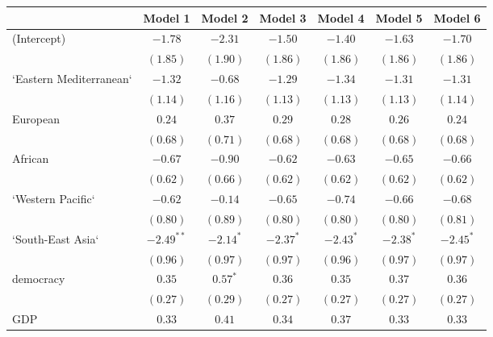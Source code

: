 
\begin{table}[!h]
\begin{center}
\begin{tabular}{l c c c c c c }
\toprule
 & Model 1 & Model 2 & Model 3 & Model 4 & Model 5 & Model 6 \\
\midrule
(Intercept)             & $-1.78$      & $-2.31$      & $-1.50$      & $-1.40$      & $-1.63$      & $-1.70$      \\
                        & $(1.85)$     & $(1.90)$     & $(1.86)$     & $(1.86)$     & $(1.86)$     & $(1.86)$     \\
`Eastern Mediterranean` & $-1.32$      & $-0.68$      & $-1.29$      & $-1.34$      & $-1.31$      & $-1.31$      \\
                        & $(1.14)$     & $(1.16)$     & $(1.13)$     & $(1.13)$     & $(1.13)$     & $(1.14)$     \\
European                & $0.24$       & $0.37$       & $0.29$       & $0.28$       & $0.26$       & $0.24$       \\
                        & $(0.68)$     & $(0.71)$     & $(0.68)$     & $(0.68)$     & $(0.68)$     & $(0.68)$     \\
African                 & $-0.67$      & $-0.90$      & $-0.62$      & $-0.63$      & $-0.65$      & $-0.66$      \\
                        & $(0.62)$     & $(0.66)$     & $(0.62)$     & $(0.62)$     & $(0.62)$     & $(0.62)$     \\
`Western Pacific`       & $-0.62$      & $-0.14$      & $-0.65$      & $-0.74$      & $-0.66$      & $-0.68$      \\
                        & $(0.80)$     & $(0.89)$     & $(0.80)$     & $(0.80)$     & $(0.80)$     & $(0.81)$     \\
`South-East Asia`       & $-2.49^{**}$ & $-2.14^{*}$  & $-2.37^{*}$  & $-2.43^{*}$  & $-2.38^{*}$  & $-2.45^{*}$  \\
                        & $(0.96)$     & $(0.97)$     & $(0.97)$     & $(0.96)$     & $(0.97)$     & $(0.97)$     \\
democracy               & $0.35$       & $0.57^{*}$   & $0.36$       & $0.35$       & $0.37$       & $0.36$       \\
                        & $(0.27)$     & $(0.29)$     & $(0.27)$     & $(0.27)$     & $(0.27)$     & $(0.27)$     \\
GDP                     & $0.33$       & $0.41$       & $0.34$       & $0.37$       & $0.33$       & $0.33$       \\

\end{tabular}
\end{center}
\end{table}
